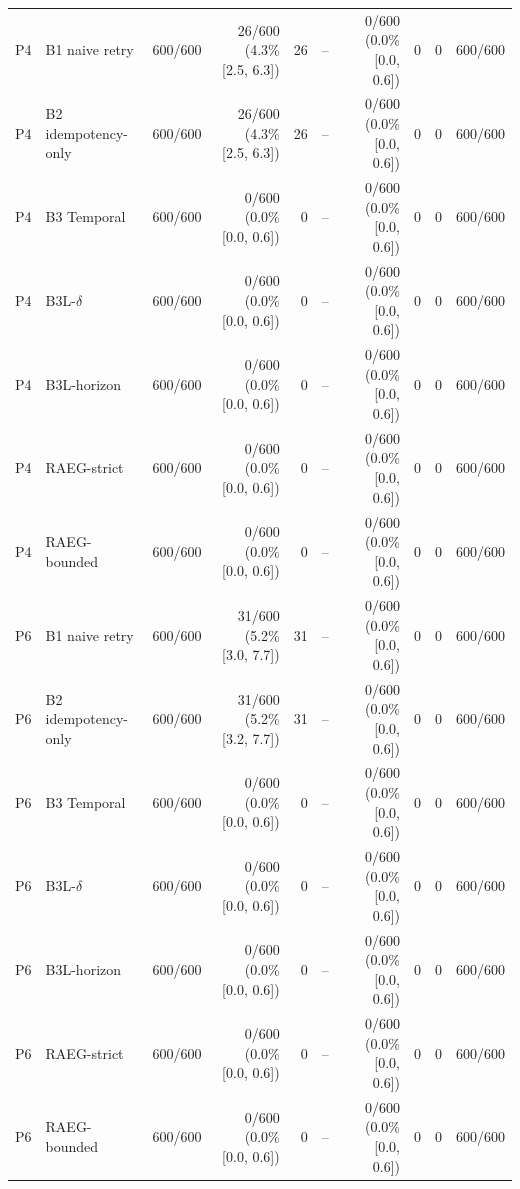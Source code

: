 \begin{table}[t]
\begin{tabular}{llrrrrrrrr}
P4 & B1 naive retry & 600/600 & 26/600 (4.3\% [2.5, 6.3]) & 26 & -- & 0/600 (0.0\% [0.0, 0.6]) & 0 & 0 & 600/600 \\
P4 & B2 idempotency-only & 600/600 & 26/600 (4.3\% [2.5, 6.3]) & 26 & -- & 0/600 (0.0\% [0.0, 0.6]) & 0 & 0 & 600/600 \\
P4 & B3 Temporal & 600/600 & 0/600 (0.0\% [0.0, 0.6]) & 0 & -- & 0/600 (0.0\% [0.0, 0.6]) & 0 & 0 & 600/600 \\
P4 & B3L-$\delta$ & 600/600 & 0/600 (0.0\% [0.0, 0.6]) & 0 & -- & 0/600 (0.0\% [0.0, 0.6]) & 0 & 0 & 600/600 \\
P4 & B3L-horizon & 600/600 & 0/600 (0.0\% [0.0, 0.6]) & 0 & -- & 0/600 (0.0\% [0.0, 0.6]) & 0 & 0 & 600/600 \\
P4 & RAEG-strict & 600/600 & 0/600 (0.0\% [0.0, 0.6]) & 0 & -- & 0/600 (0.0\% [0.0, 0.6]) & 0 & 0 & 600/600 \\
P4 & RAEG-bounded & 600/600 & 0/600 (0.0\% [0.0, 0.6]) & 0 & -- & 0/600 (0.0\% [0.0, 0.6]) & 0 & 0 & 600/600 \\
P6 & B1 naive retry & 600/600 & 31/600 (5.2\% [3.0, 7.7]) & 31 & -- & 0/600 (0.0\% [0.0, 0.6]) & 0 & 0 & 600/600 \\
P6 & B2 idempotency-only & 600/600 & 31/600 (5.2\% [3.2, 7.7]) & 31 & -- & 0/600 (0.0\% [0.0, 0.6]) & 0 & 0 & 600/600 \\
P6 & B3 Temporal & 600/600 & 0/600 (0.0\% [0.0, 0.6]) & 0 & -- & 0/600 (0.0\% [0.0, 0.6]) & 0 & 0 & 600/600 \\
P6 & B3L-$\delta$ & 600/600 & 0/600 (0.0\% [0.0, 0.6]) & 0 & -- & 0/600 (0.0\% [0.0, 0.6]) & 0 & 0 & 600/600 \\
P6 & B3L-horizon & 600/600 & 0/600 (0.0\% [0.0, 0.6]) & 0 & -- & 0/600 (0.0\% [0.0, 0.6]) & 0 & 0 & 600/600 \\
P6 & RAEG-strict & 600/600 & 0/600 (0.0\% [0.0, 0.6]) & 0 & -- & 0/600 (0.0\% [0.0, 0.6]) & 0 & 0 & 600/600 \\
P6 & RAEG-bounded & 600/600 & 0/600 (0.0\% [0.0, 0.6]) & 0 & -- & 0/600 (0.0\% [0.0, 0.6]) & 0 & 0 & 600/600 \\
\bottomrule
\end{tabular}
\end{table}
